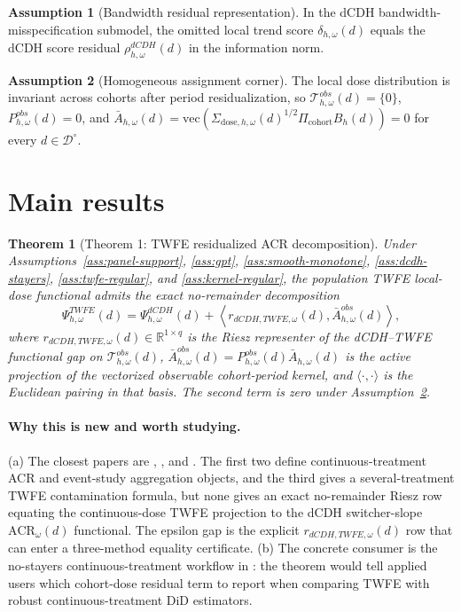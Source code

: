 \documentclass[11pt]{article}
\theoremstyle{definition}
\newtheorem{assumption}{Assumption}
\theoremstyle{plain}
\newtheorem{theorem}{Theorem}
\theoremstyle{remark}
\begin{document}
\begin{assumption}[Bandwidth residual representation]\label{ass:bandwidth-residual}
In the dCDH bandwidth-misspecification submodel, the omitted local trend score \(\delta_{h,\omega}(d)\) equals the dCDH score residual \(\rho^{dCDH}_{h,\omega}(d)\) in the information norm.
\end{assumption}

\begin{assumption}[Homogeneous assignment corner]\label{ass:homogeneous-assignment}
The local dose distribution is invariant across cohorts after period residualization, so \(\mathcal T^{obs}_{h,\omega}(d)=\{0\}\), \(P^{obs}_{h,\omega}(d)=0\), and \(\bar A_{h,\omega}(d)=\mathrm{vec}(\Sigma_{\mathrm{dose},h,\omega}(d)^{1/2}\Pi_{\mathrm{cohort}}B_h(d))=0\) for every \(d\in\mathcal D^\circ\).
\end{assumption}

\section{Main results}
\begin{theorem}[Theorem 1: TWFE residualized ACR decomposition]\label{thm:twfe-decomp}
Under Assumptions~\ref{ass:panel-support}, \ref{ass:gpt}, \ref{ass:smooth-monotone}, \ref{ass:dcdh-stayers}, \ref{ass:twfe-regular}, and \ref{ass:kernel-regular}, the population TWFE local-dose functional admits the exact no-remainder decomposition
\[
  \Psi^{TWFE}_{h,\omega}(d)
  =
  \Psi^{dCDH}_{h,\omega}(d) +
  \left\langle r_{dCDH,TWFE,\omega}(d),
    \bar A^{obs}_{h,\omega}(d)\right\rangle,
\]
where \(r_{dCDH,TWFE,\omega}(d)\in\mathbb R^{1\times q}\) is the Riesz representer of the dCDH--TWFE functional gap on \(\mathcal T^{obs}_{h,\omega}(d)\), \(\bar A^{obs}_{h,\omega}(d)=P^{obs}_{h,\omega}(d)\bar A_{h,\omega}(d)\) is the active projection of the vectorized observable cohort-period kernel, and \(\langle\cdot,\cdot\rangle\) is the Euclidean pairing in that basis. The second term is zero under Assumption~\ref{ass:homogeneous-assignment}.
\end{theorem}
\paragraph{Why this is new and worth studying.}
(a) The closest papers are \citet{CallawayGoodmanBaconSantAnna2024}, \citet{CallawayGoodmanBaconSantAnna2024EventStudies}, and \citet{deChaisemartinDHaultfoeuille2023SeveralTreatments}. The first two define continuous-treatment ACR and event-study aggregation objects, and the third gives a several-treatment TWFE contamination formula, but none gives an exact no-remainder Riesz row equating the continuous-dose TWFE projection to the dCDH switcher-slope \(\mathrm{ACR}_\omega(d)\) functional. The epsilon gap is the explicit \(r_{dCDH,TWFE,\omega}(d)\) row that can enter a three-method equality certificate. (b) The concrete consumer is the no-stayers continuous-treatment workflow in \citet{deChaisemartinDHaultfoeuilleVazquezBare2024}: the theorem would tell applied users which cohort-dose residual term to report when comparing TWFE with robust continuous-treatment DiD estimators.
\end{document}
